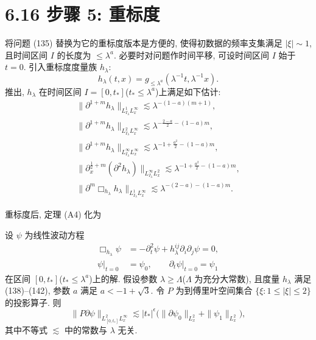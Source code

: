 \setcounter{mtthm}{16}%

\section*{6.16 步骤 5: 重标度}

将问题 (135) 替换为它的重标度版本是方便的, 使得初数据的频率支集满足 $|\xi|\sim 1$, 且时间区间 $I$ 的长度为 $\leq\lambda^a$.
必要时对问题作时间平移, 可设时间区间 $I$ 始于 $t=0$. 引入重标度度量族 $h_\lambda$:
\begin{equation}
h_\lambda(t,x)=g_{\leq\lambda^a}(\lambda^{-1}t,\lambda^{-1}x).\end{equation}
 推出, $h_\lambda$ 在时间区间 $I=[0,t_*]$($t_*\leq\lambda^a$)上满足如下估计:
\begin{gather}
\|\partial^{1+m}h_\lambda\|_{L_{I_\lambda}^1L_x^\infty}\lesssim\lambda^{-(1-a)(m+1)},\\
\|\partial^{1+m}h_\lambda\|_{L_{I_\lambda}^2L_x^\infty}\lesssim\lambda^{-\frac{2-a}{2}-(1-a)m},\\
\|\partial^{1+m}h_\lambda\|_{L_{I_\lambda}^\infty L_x^\infty}\lesssim\lambda^{-1+\frac{a^2}{2}-(1-a)m},\\
\|\partial_x^{\frac12+m}(\partial^2 h_\lambda)\|_{L_{I_\lambda}^\infty L_x^2}\lesssim\lambda^{-1+\frac{a^2}{2}-(1-a)m},\\
\|\partial^m\Box_{h_\lambda}h_\lambda\|_{L_{I_\lambda}^1L_x^\infty}\lesssim\lambda^{-(2-a)-(1-a)m}.\end{gather}

重标度后, 定理 (A4) 化为

\begin{theorem}[A5]\label{thm:6.17}
设 $\psi$ 为线性波动方程
\begin{equation}
\begin{aligned}
\Box_{h_\lambda}\psi&=-\partial_t^2\psi+h_\lambda^{ij}\partial_i\partial_j\psi=0,\\
\psi|_{t=0}&=\psi_0,\qquad \partial_t\psi|_{t=0}=\psi_1
\end{aligned}
\end{equation}
在区间 $[0,t_*]$($t_*\leq\lambda^a$)上的解. 假设参数 $\lambda\geq\Lambda$($\Lambda$ 为充分大常数), 且度量 $h_\lambda$ 满足 (138)--(142), 参数 $a$ 满足 $a<-1+\sqrt3$. 令 $P$ 为到傅里叶空间集合 $\{\xi:1\leq|\xi|\leq 2\}$ 的投影算子. 则
\begin{equation}
\|P\partial\psi\|_{L_{[0,t_*]}^2L_x^\infty}\lesssim|t_*|^\epsilon\bigl(\|\partial\psi_0\|_{L_x^2}+\|\psi_1\|_{L_x^2}\bigr),\end{equation}
其中不等式 $\lesssim$ 中的常数与 $\lambda$ 无关.\end{theorem}

